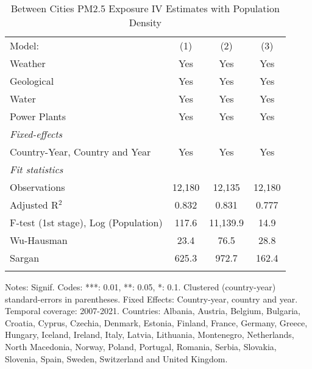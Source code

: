 
\begin{table}[htbp]
   \caption{\label{tab:iv_bet_pop} Between Cities PM2.5 Exposure IV Estimates with Population Density}
   \centering
   \small
   \begin{tabular}{lccc}
      \tabularnewline \midrule \midrule
      Model:                               & (1)    & (2)      & (3)\\  
      Weather                              & Yes    & Yes      & Yes\\  
      Geological                           & Yes    & Yes      & Yes\\  
      Water                                & Yes    & Yes      & Yes\\  
      Power Plants                         & Yes    & Yes      & Yes\\  
      \midrule
      \emph{Fixed-effects}\\
      Country-Year, Country and Year       & Yes    & Yes      & Yes\\  
      \midrule
      \emph{Fit statistics}\\
      Observations                         & 12,180 & 12,135   & 12,180\\  
      Adjusted R$^2$                       & 0.832  & 0.831    & 0.777\\  
      F-test (1st stage), Log (Population) & 117.6  & 11,139.9 & 14.9\\  
      Wu-Hausman                           & 23.4   & 76.5     & 28.8\\  
      Sargan                               & 625.3  & 972.7    & 162.4\\  
      \midrule \midrule
       \\
   \end{tabular}
   
   \par \raggedright 
   Notes: Signif. Codes: ***: 0.01, **: 0.05, *: 0.1. Clustered (country-year) standard-errors in parentheses. Fixed Effects: Country-year, country and year. Temporal coverage: 2007-2021. Countries: Albania, Austria, Belgium, Bulgaria, Croatia, Cyprus, Czechia, Denmark, Estonia, Finland, France, Germany, Greece, Hungary, Iceland, Ireland, Italy, Latvia, Lithuania, Montenegro, Netherlands, North Macedonia, Norway, Poland, Portugal, Romania, Serbia, Slovakia, Slovenia, Spain, Sweden, Switzerland and United Kingdom.
\end{table}


